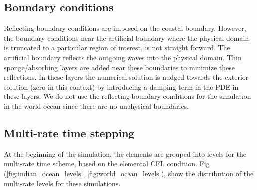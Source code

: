\subsection{Boundary conditions}
Reflecting boundary conditions are imposed on the coastal boundary. However, the boundary conditions near the artificial boundary where the physical domain is truncated to a particular region of interest, is not straight forward. The artificial boundary reflects the outgoing waves into the physical domain. Thin sponge/absorbing layers are added near these boundaries \cite{modave2010parameters} to minimize these reflections. In these layers the numerical solution is nudged towards the exterior solution (zero in this context) by introducing a damping term in the PDE in these layers. We do not use the reflecting boundary conditions for the simulation in the world ocean since there are no unphysical boundaries. 


\subsection{Multi-rate time stepping}
At the beginning of the simulation, the elements are grouped into levels for the multi-rate time scheme, based on the elemental CFL condition. Fig (\ref{fig:indian_ocean_levels}, \ref{fig:world_ocean_levels}), show the distribution of the multi-rate levels for these simulations. 

